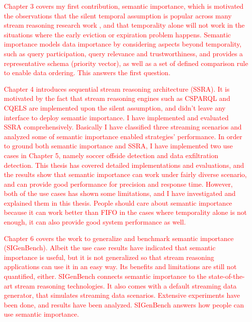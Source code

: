 \textcolor{red}{
Chapter 3 covers my first contribution, semantic importance, which is motivated the observations that the silent temporal assumption is popular across many stream reasoning research work \cite{barbieri2010stream} \cite{stuckenschmidt2010towards} \cite{golab2003processing} \cite{barbieri2010deductive}, and that temporality alone will not work in the situations where the early eviction or expiration problem happens. 
Semantic importance models data importance by considering aspects beyond temporality, such as query participation, query relevance and trustworthiness, and provides a representative schema (priority vector), as well as a set of defined comparison rule to enable data ordering. 
This answers the first question.
}

\textcolor{red}{
Chapter 4 introduces sequential stream reasoning architecture (SSRA). 
It is motivated by the fact that stream reasoning engines such as CSPARQL and CQELS are implemented upon the silent assumption, and didn't leave any interface to deploy semantic importance. 
I have implemented and evaluated SSRA comprehensively. 
Basically I have classified three streaming scenarios and analyzed some of semantic importance enabled strategies' performance. 
In order to ground both semantic importance and SSRA, I have implemented two use cases in Chapter 5, namely soccer offside detection and data exfiltration detection.
This thesis has covered detailed implementations and evaluations, and the results show that semantic importance can work under fairly diverse scenario, and can provide good performance for precision and response time. 
However, both of the use cases has shown some limitations, and I have investigated and explained them in this thesis. 
People should care about semantic importance because it can work better than FIFO in the cases where temporality alone is not enough, it can also provide good system performance as well. 
}

\textcolor{red}{
Chapter 6 covers the work to generalize and benchmark semantic importance (SIGenBench).
Albeit the use case results have indicated that semantic importance is useful, but it is not generalized so that stream reasoning applications can use it in an easy way.
Its benefits and limitations are still not quantified, either. 
SIGenBench connects semantic importance to the state-of-the-art stream reasoning technologies.
It also comes with a default streaming data generator, that simulates streaming data scenarios. 
Extensive experiments have been done, and results have been analyzed. 
SIGenBench answers how people can use semantic importance.
}
%
